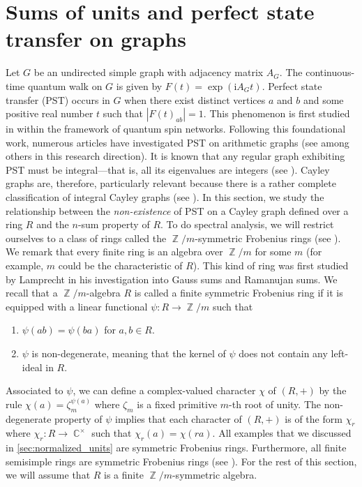 \documentclass[11pt, a4paper]{amsart}
\theoremstyle{definition}
\DeclareMathOperator{\C}{\mathbb{C}}
\DeclareMathOperator{\Z}{\mathbb{Z}}
\numberwithin{equation}{section}
\begin{document}
\section{Sums of units and perfect state transfer on graphs} \label{sec:pst}
Let $G$ be an undirected simple graph with adjacency matrix $A_G$. The continuous-time quantum walk on $G$ is given by $F(t) = \exp(\mathrm{i}A_G t)$. Perfect state transfer (PST) occurs in $G$ when there exist distinct vertices $a$ and $b$ and some positive real number $t$ such that $|F(t)_{ab}| = 1$. This phenomenon is first studied in \cite{christandl2004perfect} within the framework of quantum spin networks. Following this foundational work, numerous articles have investigated PST on arithmetic graphs (see \cite{bavsic2009perfect, cheung2011perfect, godsil2012state, saxena2007parameters} among others in this research direction). It is known that any regular graph exhibiting PST must be integral—that is, all its eigenvalues are integers (see \cite{godsil2012state, saxena2007parameters}). Cayley graphs are, therefore, particularly relevant because there is a rather complete classification of integral Cayley graphs (see \cite{godsil2025integral, klotz2007some, nguyen2024integral, so2006integral}). In this section, we study the relationship between the \textit{non-existence} of PST on a Cayley graph defined over a ring $R$ and the $n$-sum property of $R.$ To do spectral analysis, we will restrict ourselves to a class of rings called the $\Z/m$-symmetric Frobenius rings (see \cite{honold2001characterization, lamprecht1953allgemeine}). We remark that every finite ring is an algebra over $\Z/m$ for some $m$ (for example, $m$ could be the characteristic of $R$). This kind of ring was first studied by Lamprecht in his investigation into Gauss sums and Ramanujan sums. We recall that a $\Z/m$-algebra $R$ is called a finite symmetric Frobenius ring if it is equipped with a linear functional $\psi: R \to \Z/m$ such that 
\begin{enumerate}
    \item $\psi(ab)=\psi(ba)$ for $a,b \in R.$
    \item $\psi$ is non-degenerate, meaning that  the kernel of $\psi$ does not contain any left-ideal in $R.$
\end{enumerate}
Associated to $\psi$, we can define a complex-valued character $\chi$ of $(R,+)$ by the rule $\chi(a)= \zeta_m^{\psi(a)}$ where $\zeta_m$ is a fixed primitive $m$-th root of unity.  The non-degenerate property of $\psi$ implies that each character of $(R,+)$ is of the form $\chi_r$ where $\chi_r: R \to \C^{\times}$ such that $\chi_r(a)=\chi(ra).$
All examples that we discussed in \cref{sec:normalized_units} are symmetric Frobenius rings. Furthermore, all finite semisimple rings are symmetric Frobenius rings (see \cite{honold2001characterization}). For the rest of this section, we will assume that $R$ is a finite $\Z/m$-symmetric algebra. 
\end{document}
